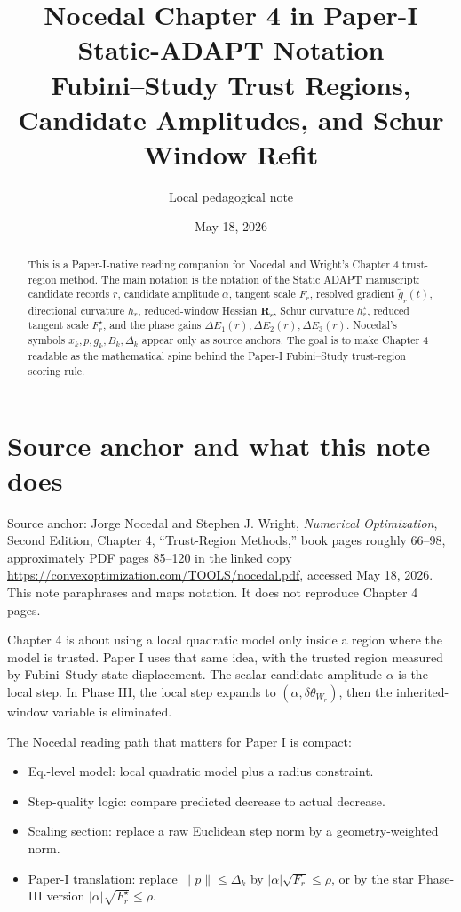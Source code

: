 \documentclass[10pt,twocolumn]{article}
\title{Nocedal Chapter 4 in Paper-I Static-ADAPT Notation\\[-1mm]
\large Fubini--Study Trust Regions, Candidate Amplitudes, and Schur Window Refit}
\author{Local pedagogical note}
\date{May 18, 2026}
\begin{document}
\maketitle

\begin{abstract}
This is a Paper-I-native reading companion for Nocedal and Wright's Chapter 4 trust-region method. The main notation is the notation of the Static ADAPT manuscript: candidate records \(r\), candidate amplitude \(\alpha\), tangent scale \(F_r\), resolved gradient \(\widetilde g_r(t)\), directional curvature \(h_r\), reduced-window Hessian \(\mathbf R_r\), Schur curvature \(h_r^\star\), reduced tangent scale \(F_r^\star\), and the phase gains \(\Delta E_1(r),\Delta E_2(r),\Delta E_3(r)\). Nocedal's symbols \(x_k,p,g_k,B_k,\Delta_k\) appear only as source anchors. The goal is to make Chapter 4 readable as the mathematical spine behind the Paper-I Fubini--Study trust-region scoring rule.
\end{abstract}

\section{Source anchor and what this note does}

\begin{cautionbox}
Source anchor: Jorge Nocedal and Stephen J. Wright, \emph{Numerical Optimization}, Second Edition, Chapter 4, ``Trust-Region Methods,'' book pages roughly 66--98, approximately PDF pages 85--120 in the linked copy \url{https://convexoptimization.com/TOOLS/nocedal.pdf}, accessed May 18, 2026. This note paraphrases and maps notation. It does not reproduce Chapter 4 pages.
\end{cautionbox}

\begin{intuitionbox}
Chapter 4 is about using a local quadratic model only inside a region where the model is trusted. Paper I uses that same idea, with the trusted region measured by Fubini--Study state displacement. The scalar candidate amplitude \(\alpha\) is the local step. In Phase III, the local step expands to \((\alpha,\delta\theta_{W_r})\), then the inherited-window variable is eliminated.
\end{intuitionbox}

The Nocedal reading path that matters for Paper I is compact:
\begin{itemize}
\item Eq.-level model: local quadratic model plus a radius constraint.
\item Step-quality logic: compare predicted decrease to actual decrease.
\item Scaling section: replace a raw Euclidean step norm by a geometry-weighted norm.
\item Paper-I translation: replace \(\|p\|\le \Delta_k\) by \(|\alpha|\sqrt{F_r}\le\rho\), or by the star Phase-III version \(|\alpha|\sqrt{F_r^\star}\le\rho\).
\end{itemize}
\end{document}
